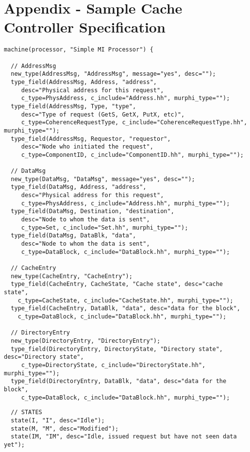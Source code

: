 \documentclass[11pt]{article}
\begin{document}
\newpage
\section*{Appendix - Sample Cache Controller Specification}

{\small
\begin{verbatim}
machine(processor, "Simple MI Processor") {

  // AddressMsg
  new_type(AddressMsg, "AddressMsg", message="yes", desc="");
  type_field(AddressMsg, Address, "address",
     desc="Physical address for this request",
     c_type=PhysAddress, c_include="Address.hh", murphi_type="");
  type_field(AddressMsg, Type, "type",
     desc="Type of request (GetS, GetX, PutX, etc)",
     c_type=CoherenceRequestType, c_include="CoherenceRequestType.hh", murphi_type="");
  type_field(AddressMsg, Requestor, "requestor",
     desc="Node who initiated the request",
     c_type=ComponentID, c_include="ComponentID.hh", murphi_type="");

  // DataMsg
  new_type(DataMsg, "DataMsg", message="yes", desc="");
  type_field(DataMsg, Address, "address",
     desc="Physical address for this request",
     c_type=PhysAddress, c_include="Address.hh", murphi_type="");
  type_field(DataMsg, Destination, "destination",
     desc="Node to whom the data is sent",
     c_type=Set, c_include="Set.hh", murphi_type="");
  type_field(DataMsg, DataBlk, "data",
     desc="Node to whom the data is sent",
     c_type=DataBlock, c_include="DataBlock.hh", murphi_type="");

  // CacheEntry
  new_type(CacheEntry, "CacheEntry");
  type_field(CacheEntry, CacheState, "Cache state", desc="cache state",
    c_type=CacheState, c_include="CacheState.hh", murphi_type="");
  type_field(CacheEntry, DataBlk, "data", desc="data for the block",
    c_type=DataBlock, c_include="DataBlock.hh", murphi_type="");

  // DirectoryEntry
  new_type(DirectoryEntry, "DirectoryEntry");
  type_field(DirectoryEntry, DirectoryState, "Directory state", desc="Directory state",
     c_type=DirectoryState, c_include="DirectoryState.hh", murphi_type="");
  type_field(DirectoryEntry, DataBlk, "data", desc="data for the block",
     c_type=DataBlock, c_include="DataBlock.hh", murphi_type="");

\end{verbatim}
\newpage
\begin{verbatim}
  // STATES
  state(I, "I", desc="Idle");
  state(M, "M", desc="Modified");
  state(IM, "IM", desc="Idle, issued request but have not seen data yet");


\end{verbatim}}
\end{document}
